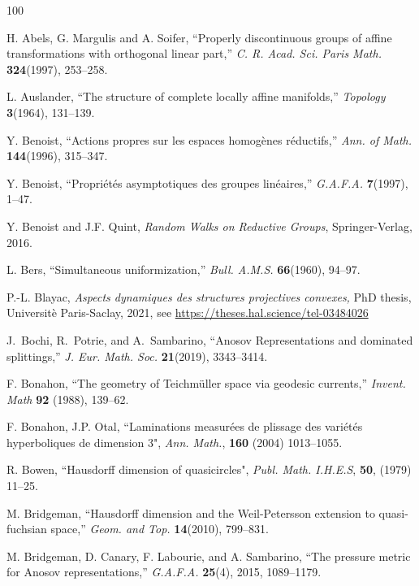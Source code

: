 \documentclass{amsart}
\theoremstyle{plain}
\theoremstyle{definition}
\theoremstyle{remark}
\newcommand{\<}{\left <}
\renewcommand{\>}{\right >}
\begin{document}
 
\begin{thebibliography}{100}
\begin{scriptsize}

 H. Abels, G. Margulis and A. Soifer, ``Properly discontinuous groups of affine transformations with orthogonal linear part,''
{\em C. R. Acad. Sci. Paris  Math.} {\bf 324}(1997),  253--258.

 L. Auslander, ``The structure of complete locally affine manifolds,''
{\em Topology}  {\bf 3}(1964), 131--139.

 Y. Benoist, ``Actions propres sur les espaces homog\`enes r\'eductifs,'' {\em Ann. of Math.} {\bf 144}(1996), 315--347.

 Y. Benoist, ``Propri{\'e}t{\'e}s asymptotiques des groupes lin{\'e}aires,'' {\em G.A.F.A.} {\bf 7}(1997), 1--47.

 Y. Benoist and J.F. Quint, {\em Random Walks on Reductive Groups}, Springer-Verlag, 2016.


 L. Bers, ``Simultaneous uniformization,'' {\em Bull. A.M.S.} {\bf 66}(1960), 94--97. 


 P.-L. Blayac,  {\em Aspects dynamiques des structures projectives convexes,} 
 PhD thesis, Universit\`e Paris-Saclay, 2021, see \url{https://theses.hal.science/tel-03484026}

J.~Bochi, R.~Potrie, and A.~Sambarino,
``Anosov Representations and dominated splittings,''
{\em J. Eur. Math. Soc.} {\bf 21}(2019), 3343--3414.


 F. Bonahon, ``The geometry of Teichm\"uller space via geodesic currents,'' {\em Invent. Math}
{\bf 92} (1988), 139--62.

 F. Bonahon, J.P.  Otal, ``Laminations measur\'ees de plissage des vari\'et\'es hyperboliques de dimension 3", {\em Ann.  Math.}, {\bf 160} (2004) 1013--1055. 

 R. Bowen, ``Hausdorff dimension of quasicircles",
{\em Publ. Math. I.H.E.S}, {\bf 50}, (1979) 11--25.
 
 M. Bridgeman, ``Hausdorff dimension and the Weil-Petersson extension
to quasi-fuchsian space,''
{\em Geom. and Top.} {\bf 14}(2010),  799--831.



 M. Bridgeman, D. Canary, F. Labourie,  and  A. Sambarino, ``The pressure metric for Anosov representations,''
{\em G.A.F.A.} {\bf 25}(4), 2015, 1089--1179.



\end{scriptsize}
\end{thebibliography}
\end{document}
